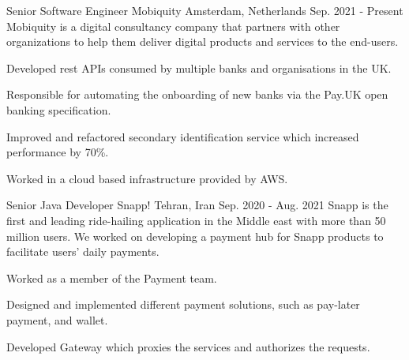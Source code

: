 

\begin{cventries}

  \cventry
    {Senior Software Engineer} %
    {Mobiquity} %
    {Amsterdam, Netherlands} %
    {Sep. 2021 - Present} %
    {
      Mobiquity is a digital consultancy company that partners with other organizations to help them deliver digital products and services to the end-users.
    }
    {
      \begin{cvitems} %
        \item {Developed rest APIs consumed by multiple banks and organisations in the UK.}
        \item {Responsible for automating the onboarding of new banks via the Pay.UK open banking specification.}
        \item {Improved and refactored secondary identification service which increased performance by 70\%.}
        \item {Worked in a cloud based infrastructure provided by AWS.}
      \end{cvitems}
    }

  \cventry
    {Senior Java Developer} %
    {Snapp!} %
    {Tehran, Iran} %
    {Sep. 2020 - Aug. 2021} %
    {
      Snapp is the first and leading ride-hailing application in the Middle east with more than 50 million users.
      We worked on developing a payment hub for Snapp products to facilitate users' daily payments.
    }
    {
      \begin{cvitems} %
        \item {Worked as a member of the Payment team.}
        \item {Designed and implemented different payment solutions, such as pay-later payment, and wallet.}
        \item {Developed Gateway which proxies the services and authorizes the requests.}
      \end{cvitems}
    }


\end{cventries}
